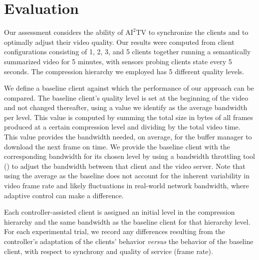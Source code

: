 \documentclass{sig-alternate}
\begin{document}

\section{Evaluation} \label{eval}

Our assessment considers the ability of $\mathrm{AI}^2$TV to
synchronize the clients and to optimally adjust their video quality.
Our results were computed from client configurations consisting of 1,
2, 3, and 5 clients together running a semantically summarized video
for 5 minutes, with sensors probing clients state every 5 seconds. The
compression hierarchy we employed has 5 different quality levels.

We define a baseline client against which the performance of our
approach can be compared.  The baseline client's quality level is set
at the beginning of the video and not changed thereafter, using a
value we identify as the average bandwidth per level. This value is
computed by summing the total size in bytes of all frames produced at
a certain compression level and dividing by the total video time.
This value provides the bandwidth needed, on average, for the buffer
manager to download the next frame on time.  We provide the baseline
client with the corresponding bandwidth for its chosen level by using
a bandwidth throttling tool (\cite{SHAPERD}) to adjust the bandwidth
between that client and the video server.  Note that using the average
as the baseline does not account for the inherent variability in video
frame rate and likely fluctuations in real-world network bandwidth,
where adaptive control can make a difference.

Each controller-assisted client is assigned an initial level in the
compression hierarchy and the same bandwidth as the baseline client
for that hierarchy level.  For each experimental trial, we record any
differences resulting from the controller's adaptation of the clients'
behavior {\it versus} the behavior of the baseline client, with
respect to synchrony and quality of service (frame rate).

 
\end{document}
